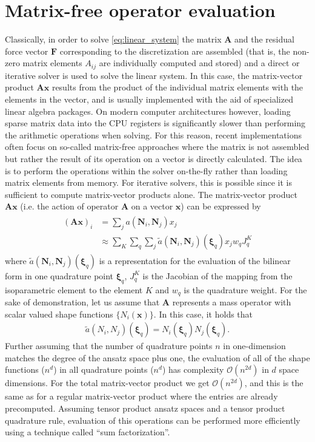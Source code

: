 \documentclass[times,doublespace]{nmeauth}
\def\gz  #1{           \mbox{$\boldsymbol{#1}$}}
\begin{document}
\section{Matrix-free operator evaluation}
\label{sec:mf}
Classically, in order to solve \eqref{eq:linear_system} the matrix $\gz A$ and the residual force vector $\gz F$ corresponding to the discretization are assembled (that is, the non-zero matrix elements $A_{ij}$ are individually computed and stored) and a direct or iterative solver is used to solve the linear system.
In this case, the matrix-vector product $\gz A \gz x$ results from the product of the individual matrix elements with the elements in the vector, and is usually implemented with the aid of specialized linear algebra packages.
On modern computer architectures however, loading sparse matrix data into the CPU registers is significantly slower than performing the arithmetic operations when solving.
For this reason, recent implementations often focus on so-called matrix-free approaches where the matrix is not assembled but rather the result of its operation on a vector is directly calculated.
The idea is to perform the operations within the solver on-the-fly rather than loading matrix elements from memory.
For iterative solvers, this is possible since it is sufficient to compute matrix-vector products alone.
%
The matrix-vector product $\gz A \gz x$ (i.e. the action of operator $\gz A$ on a vector $\gz x$) can be expressed by
\begin{align}
  \begin{split}
 (\gz A \gz x)_i &= \sum_j a(\gz N_i,\gz N_j) x_j \\
        &\approx \sum_K \sum_q \sum_j \tilde{a}(\gz N_i,\gz N_j)(\gz \xi_q) x_j w_q J^K_q
  \end{split}
  \label{eq:mf_vmult}
\end{align}
where $\tilde{a}(\gz N_i,\gz N_j)(\gz \xi_q)$ is a representation for the evaluation of the bilinear form in one quadrature point $\gz \xi_q$, $J^K_q$ is the Jacobian of the mapping from the isoparametric element to the element $K$ and
$w_q$ is the quadrature weight.
For the sake of demonstration, let us assume that $\gz A$ represents a mass operator with scalar valued shape functions $\{ N_i(\gz x) \}$. In this case, it holds that
\begin{align*}
 \tilde{a}(N_i,N_j)(\gz \xi_q) = N_i(\gz \xi_q)N_j(\gz \xi_q).
\end{align*}
Further assuming that the number of quadrature points $n$ in one-dimension matches the degree of the ansatz space plus one, the evaluation of all of the shape functions ($n^d$)
in all quadrature points ($n^d$) has complexity $\mathcal{O}(n^{2d})$ in $d$ space dimensions.
For the total matrix-vector product we get $\mathcal{O}(n^{2d})$,
and this is the same as for a regular matrix-vector product where the entries are already precomputed. Assuming tensor product ansatz spaces and a tensor product quadrature rule, evaluation of this operations can be performed more efficiently using a technique called ``sum factorization''.
\end{document}
